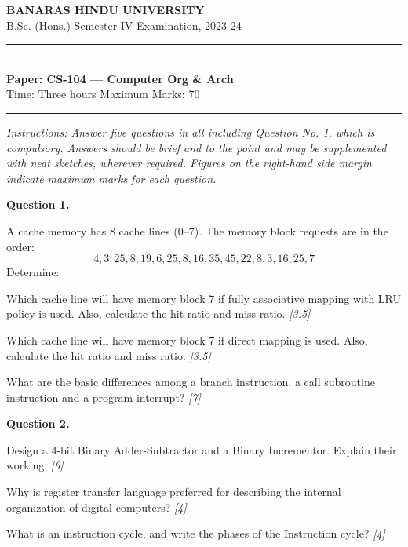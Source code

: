 \documentclass[11pt,a4paper]{article}
\newcommand{\pts}[1]{\hfill   \textit{[#1]}}
\begin{document}
\begin{center}
  {\large\bfseries BANARAS HINDU UNIVERSITY}\\[2pt]
  {\normalsize B.Sc. (Hons.) Semester IV Examination, 2023-24}\\[6pt]
  \rule{0.8\linewidth}{0.5pt}\\[6pt]
  {\large\bfseries Paper: CS-104 --- Computer Org \& Arch}\\[4pt]
  {\normalsize Time: Three hours \hfill Maximum Marks: 70}
\end{center}

\rule{\linewidth}{0.4pt}

\smallskip



\noindent   \textit{Instructions: Answer five questions in all including Question No. 1, which is compulsory. Answers should be brief and to the point and may be supplemented with neat sketches, wherever required. Figures on the right-hand side margin indicate maximum marks for each question.}

\bigskip

\medskip


\noindent   \textbf{Question 1.}

\begin{parts}
  \item A cache memory has 8 cache lines (0--7). The memory block requests are in the order:
  \[ 4, 3, 25, 8, 19, 6, 25, 8, 16, 35, 45, 22, 8, 3, 16, 25, 7 \]
  Determine:
  
\begin{parts}
    \item Which cache line will have memory block 7 if fully associative mapping with LRU policy is used. Also, calculate the hit ratio and miss ratio. \pts{3.5}
    \item Which cache line will have memory block 7 if direct mapping is used. Also, calculate the hit ratio and miss ratio. \pts{3.5}
  \end{parts}
  \item What are the basic differences among a branch instruction, a call subroutine instruction and a program interrupt? \pts{7}
\end{parts}

\medskip


\noindent   \textbf{Question 2.}

\begin{parts}
  \item Design a 4-bit Binary Adder-Subtractor and a Binary Incrementor. Explain their working. \pts{6}
  \item Why is register transfer language preferred for describing the internal organization of digital computers? \pts{4}
  \item What is an instruction cycle, and write the phases of the Instruction cycle? \pts{4}
\end{parts}
\end{document}
